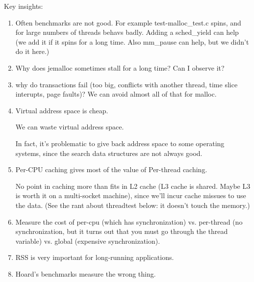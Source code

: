 Key insights:
\begin{enumerate}
 \item Often benchmarks are not good.  For example test-malloc\_test.c spins, and for large numbers of threads behavs badly.  Adding a sched\_yield can help (we add it if it spins for a long time.  Also mm\_pause can help, but we didn't do it here.)
 \item  Why does jemalloc sometimes stall for a long time?   Can I observe it?
 \item why do transactions fail (too big, conflicts with another thread, time slice interupts, page faults)?  We can avoid almost all of that for malloc.


 \item Virtual address space is cheap.  

 We can waste virtual address space.

 In fact, it's problematic to give back address space to some
 operating systems, since the search data structures are not always
 good.

 \item Per-CPU caching gives most of the value of Per-thread caching.

  No point in caching more than fits in L2 cache (L3 cache is shared.  Maybe L3 is worth it on a multi-socket machine), since we'll incur cache missues to use the data.  (See the rant about threadtest below: it doesn't touch the memory.)

 \item Measure the cost of per-cpu (which has synchronization) vs. per-thread (no synchronization, but it turns out that you must go through the thread variable) vs. global (expensive synchronization).

 \item RSS is very important for long-running applications.

 \item Hoard's benchmarks measure the wrong thing.
\end{enumerate}
